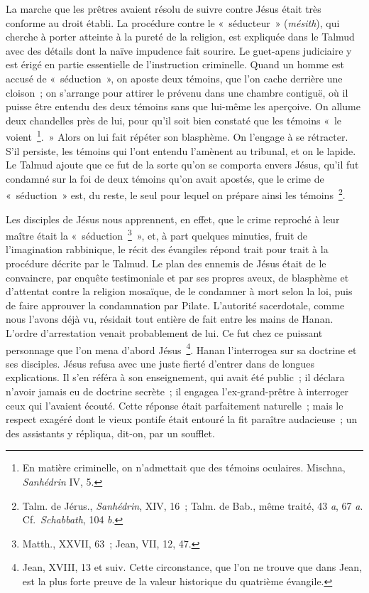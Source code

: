 \documentclass[french,twoside]{book} %
\begin{document}
La marche que les prêtres avaient résolu de suivre contre Jésus était très conforme au droit établi. La procédure contre le « séducteur » ({\itshape mésith}), qui cherche à porter atteinte à la pureté de la religion, est expliquée dans le Talmud avec des détails dont la naïve impudence fait sourire. Le guet-apens judiciaire y est érigé en partie essentielle de l’instruction criminelle. Quand un homme est accusé de « séduction », on aposte deux témoins, que l’on cache derrière une cloison ; on s’arrange pour attirer le prévenu dans une chambre contiguë, où il puisse être entendu des deux témoins sans que lui-même les aperçoive. On allume deux chandelles près de lui, pour qu’il soit bien constaté que les témoins « le voient \footnote{ En matière criminelle, on n’admettait que des témoins oculaires. Mischna, {\itshape Sanhédrin} IV, 5.}. » Alors on lui fait répéter son blasphème. On l’engage à se rétracter. S’il persiste, les témoins qui l’ont entendu l’amènent au tribunal, et on le lapide. Le Talmud ajoute que ce fut de la sorte qu’on se comporta envers Jésus, qu’il fut condamné sur la foi de deux témoins qu’on avait apostés, que le crime de « séduction » est, du reste, le seul pour lequel on prépare ainsi les témoins \footnote{ Talm. de Jérus., {\itshape Sanhédrin}, XIV, 16 ; Talm. de Bab., même traité, 43 {\itshape a}, 67 {\itshape a}. Cf. {\itshape Schabbath}, 104 {\itshape b}.}.\par
Les disciples de Jésus nous apprennent, en effet, que le crime reproché à leur maître était la « séduction \footnote{Matth., XXVII, 63 ; Jean, VII, 12, 47.} », et, à part quelques minuties, fruit de l’imagination rabbinique, le récit des évangiles répond trait pour trait à la procédure décrite par le Talmud. Le plan des ennemis de Jésus était de le convaincre, par enquête testimoniale et par ses propres aveux, de blasphème et d’attentat contre la religion mosaïque, de le condamner à mort selon la loi, puis de faire approuver la condamnation par Pilate. L’autorité sacerdotale, comme nous l’avons déjà vu, résidait tout entière de fait entre les mains de Hanan. L’ordre d’arrestation venait probablement de lui. Ce fut chez ce puissant personnage que l’on mena d’abord Jésus \footnote{Jean, XVIII, 13 et suiv. Cette circonstance, que l’on ne trouve que dans Jean, est la plus forte preuve de la valeur historique du quatrième évangile.}. Hanan l’interrogea sur sa doctrine et ses disciples. Jésus refusa avec une juste fierté d’entrer dans de longues explications. Il s’en référa à son enseignement, qui avait été public ; il déclara n’avoir jamais eu de doctrine secrète ; il engagea l’ex-grand-prêtre à interroger ceux qui l’avaient écouté. Cette réponse était parfaitement naturelle ; mais le respect exagéré dont le vieux pontife était entouré la fit paraître audacieuse ; un des assistants y répliqua, dit-on, par un soufflet.\par
\end{document}

